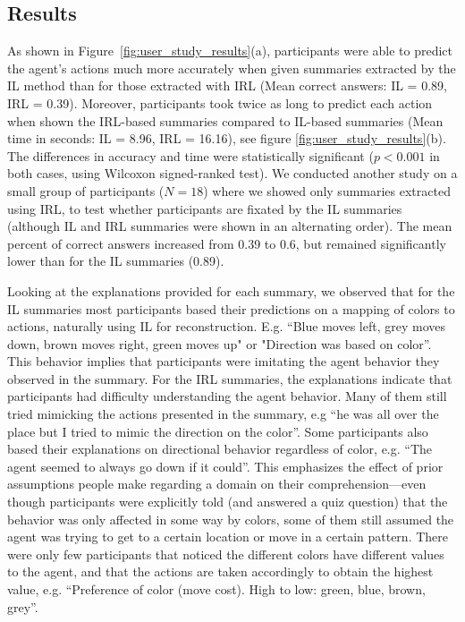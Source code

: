 \documentclass{article}
\begin{document}
\subsection{Results}
As shown in Figure~\ref{fig:user_study_results}(a), participants were able to predict the agent's actions much more accurately when given summaries extracted by the IL method than for those extracted with IRL (Mean correct answers: IL = 0.89, IRL = 0.39). Moreover, participants took twice as long to predict each action when shown the IRL-based summaries compared to IL-based summaries (Mean time in seconds: IL = 8.96, IRL = 16.16), see figure \ref{fig:user_study_results}(b). The differences in accuracy and time were statistically significant ($p<0.001$ in both cases, using Wilcoxon signed-ranked test).
We conducted another study on a small group of participants ($N=18$) where we showed only summaries extracted using IRL, to test whether participants are fixated by the IL summaries (although IL and IRL summaries were shown in an alternating order). The mean percent of correct answers increased from 0.39 to 0.6, but remained significantly lower than for the IL summaries (0.89). 

Looking at the explanations provided for each summary, we observed that for the IL summaries most participants based their predictions on a mapping of colors to actions, naturally using IL for reconstruction. E.g. ``Blue moves left, grey moves down, brown moves right, green moves up" or "Direction was based on color''. This behavior implies that participants were imitating the agent behavior they observed in the summary. For the IRL summaries, the explanations indicate that participants had difficulty understanding the agent behavior. Many of them still tried mimicking the actions presented in the summary, e.g ``he was all over the place but I tried to mimic the direction on the color''. Some participants also based their explanations on directional behavior regardless of color, e.g. ``The agent seemed to always go down if it could''. This emphasizes the effect of prior assumptions people make regarding a domain on their comprehension---even though participants were explicitly told (and answered a quiz question) that the behavior was only affected in some way by colors, some of them still assumed the agent was trying to get to a certain location or move in a certain pattern. There were only few participants that noticed the different colors have different values to the agent, and that the actions are taken accordingly to obtain the highest value, e.g. ``Preference of color (move cost). High to low: green, blue, brown, grey''. 
\end{document}
